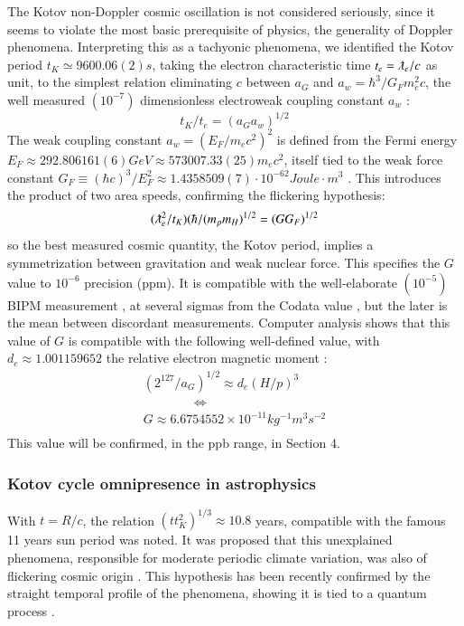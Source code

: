 \documentclass[twoside,draft]{article}
\begin{document}
\begin{sloppypar}
{The Kotov non-Doppler cosmic oscillation \cite{Sanchez1} is not considered seriously, since it seems to
violate the most basic prerequisite of physics, the generality of Doppler phenomena. Interpreting
this as a tachyonic phenomena, we identified the Kotov period $t_{K} \simeq 9600.06(2) s$, taking the electron
characteristic time $t_{e} = \lambdabar_{e} /c$ as unit, to the simplest relation eliminating $c$ between $a_{G}$ and $a_{w}=
\hbar^{3} /G_{F} m_{e}^{2} c$, the well measured $(10^{-7})$ dimensionless electroweak coupling constant $a_{w}$ :
\begin{equation}
t_{K} / t_{e} = (a_{G} a_{w})^{1/2}
\end{equation}
The weak coupling constant \cite{Carr} $a_{w} = (E_{F} /m_{e} c^{2} )^{2}$ is defined from the Fermi energy 
$
E_{F} \approx 292.806161(6) GeV \approx 573007.33(25) m_{e} c^{2}
$, itself tied to the weak force constant 
$
G_{F} \equiv (\hbar c)^{3} /E_{F}^{2} \approx
1.4358509(7) \cdot 10^{-62} Joule \cdot m^{3}
$
. This introduces the product of two area speeds, confirming the
flickering hypothesis:
\begin{equation}
(\lambdabar_{e}^2/t_{K} )(\hbar/(m_{p} m_{H})^{1/2} = (GG_{F})^{1/2}
\end{equation}
so the best measured cosmic quantity, the Kotov period, implies a symmetrization between
gravitation and weak nuclear force. This specifies the $G$ value to $10^{-6}$ precision (ppm). It is
compatible with the well-elaborate $(10^{-5})$ BIPM measurement \cite{Quinn}, at several sigmas from the Codata
value \cite{Tanabashi}, but the later is the mean between discordant measurements.
Computer analysis shows that this value of $G$ is compatible with the following well-defined value, with $d_{e} \approx 1.001159652$ the relative electron magnetic moment :
$$\begin{array}{ll}
(2^{127} /a_{G} )^{1/2} \approx d_{e} (H/p)^{3} \\
\qquad  \qquad \Leftrightarrow \\
G \approx 6.6754552 \times 10^{-11} kg^{-1} m^{3} s^{-2} \\
\end{array}$$
This value will be confirmed, in the ppb range, in Section 4.

\subsubsection{Kotov cycle omnipresence in astrophysics}

With $t = R/c$, the relation $(t t_{K}^2)^{1/3} \approx 10.8$ years, compatible with the famous 11 years sun period
was noted. It was proposed that this unexplained phenomena, responsible for moderate periodic
climate variation, was also of flickering cosmic origin \cite{Sanchez3}. This hypothesis has been recently
confirmed by the straight temporal profile of the phenomena, showing it is tied to a quantum
process \cite{Kotov2}.

}
\end{sloppypar}
\end{document}
